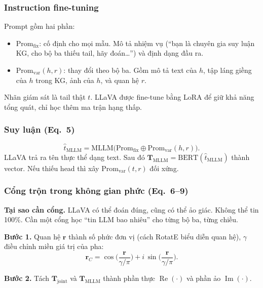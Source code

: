\documentclass[11pt,a4paper]{article}
\newcommand{\Tj}{\mathbf{T}_{\mathrm{joint}}}
\newcommand{\Tm}{\mathbf{T}_{\mathrm{MLLM}}}
\renewcommand{\Re}{\operatorname{Re}}
\renewcommand{\Im}{\operatorname{Im}}
\newcommand{\Prom}{\mathrm{Prom}}
\begin{document}
\subsubsection{Instruction fine-tuning}

Prompt gồm hai phần:
\begin{itemize}
\item $\Prom_{\mathrm{fix}}$: cố định cho mọi mẫu. Mô tả nhiệm vụ (``bạn là chuyên gia suy luận KG, cho bộ ba thiếu tail, hãy đoán\ldots'') và định dạng đầu ra.
\item $\Prom_{\mathrm{var}}(h, r)$: thay đổi theo bộ ba. Gồm mô tả text của $h$, tập láng giềng của $h$ trong KG, ảnh của $h$, và quan hệ $r$.
\end{itemize}
Nhãn giám sát là tail thật $t$. LLaVA được fine-tune bằng LoRA để giữ khả năng tổng quát, chỉ học thêm ma trận hạng thấp.

\subsubsection{Suy luận (Eq.~5)}

\begin{equation}
\hat{t}_{\mathrm{MLLM}} = \mathrm{MLLM}\big(\Prom_{\mathrm{fix}} \oplus \Prom_{\mathrm{var}}(h, r)\big).
\label{eq:mllm}
\end{equation}
LLaVA trả ra tên thực thể dạng text. Sau đó $\Tm = \mathrm{BERT}(\hat{t}_{\mathrm{MLLM}})$ thành vector. Nếu thiếu head thì xây $\Prom_{\mathrm{var}}(t, r)$ đối xứng.

\subsubsection{Cổng trộn trong không gian phức (Eq.~6--9)}

\textbf{Tại sao cần cổng.} LLaVA có thể đoán đúng, cũng có thể ảo giác. Không thể tin 100\%. Cần một cổng học ``tin LLM bao nhiêu'' cho từng bộ ba, từng chiều.

\textbf{Bước 1.} Quan hệ $\mathbf{r}$ thành số phức đơn vị (cách RotatE biểu diễn quan hệ), $\gamma$ điều chỉnh miền giá trị của pha:
\begin{equation}
\mathbf{r}_C = \cos\!\Big(\frac{\mathbf{r}}{\gamma/\pi}\Big) + i\,\sin\!\Big(\frac{\mathbf{r}}{\gamma/\pi}\Big).
\label{eq:rc}
\end{equation}

\textbf{Bước 2.} Tách $\Tj$ và $\Tm$ thành phần thực $\Re(\cdot)$ và phần ảo $\Im(\cdot)$.
\end{document}
